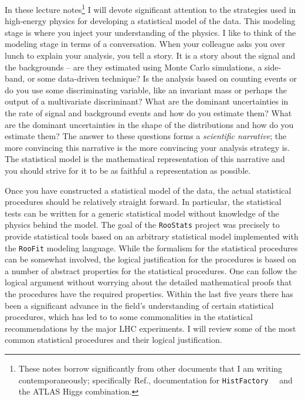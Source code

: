\documentclass{cernrep}
\newcommand{\HF}{\texttt{HistFactory}}
\begin{document}
In these lecture notes\footnote{These notes borrow significantly from other documents that I am writing contemporaneously; specifically Ref.\cite{asimov}, documentation for \HF\ ~\cite{histfactory} and the ATLAS Higgs combination. } I will devote significant attention to the strategies used in high-energy physics for developing a statistical model of the data.  This modeling stage is where you inject your understanding of the physics.  I like to think of the modeling stage in terms of a conversation.  When your colleague asks you over lunch to explain your analysis, you tell a story.  It is a story about the signal and the backgrounds -- are they estimated using Monte Carlo simulations, a side-band, or some data-driven technique?    Is the analysis based on counting events or do you use some discriminating variable, like an invariant mass or perhaps the output of a multivariate discriminant?  What are the dominant uncertainties in the rate of signal and background events and how do you estimate them?  What are the dominant uncertainties in the shape of the distributions and how do you estimate them?  The answer to these questions forms a \textit{scientific narrative}; the more convincing this narrative is the more convincing your analysis strategy is.  The statistical model is the mathematical representation of this narrative and you should strive for it to be as faithful a representation as possible.

Once you have constructed a statistical model of the data, the actual statistical procedures should be relatively straight forward.  In particular, the statistical tests can be written for a generic statistical model without knowledge of the physics behind the model.  The goal of the \texttt{RooStats} project was precisely to provide statistical tools based on an arbitrary statistical model implemented with the \texttt{RooFit} modeling language.  While the formalism for the statistical procedures can be somewhat involved, the logical justification for the procedures is based on a number of abstract properties for the statistical procedures. One can follow the logical argument without worrying about the detailed mathematical proofs that the procedures have the required properties.  Within the last five years there has been a significant advance in the field's understanding of certain statistical procedures, which has led to to some commonalities in the statistical recommendations by the major LHC experiments.  I will review some of the most common statistical procedures and their logical justification.
\end{document}
